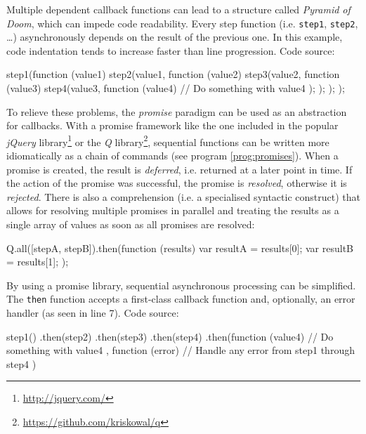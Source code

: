 \begin{program}
  \caption{Multiple dependent callback functions can lead to a structure called \textit{Pyramid of Doom}, which can impede code readability. Every step function (i.e. \texttt{step1}, \texttt{step2}, \ldots) asynchronously depends on the result of the previous one. In this example, code indentation tends to increase faster than line progression. Code source: \cite[p. 21]{Torstensson2012}}
  \label{prog:doom}
  \begin{JavaCode}
step1(function (value1) {
    step2(value1, function (value2) {
        step3(value2, function (value3) {
            step4(value3, function (value4) {
                // Do something with value4
            });
        });
    });
});	
  \end{JavaCode}
\end{program}
To relieve these problems, the \textit{promise} paradigm can be used as an abstraction for callbacks. With a promise framework like the one included in the popular \textit{jQuery} library\footnote{\url{http://jquery.com/}} or the \textit{Q} library\footnote{\url{https://github.com/kriskowal/q}}, sequential functions can be written more idiomatically as a chain of commands (see program \ref{prog:promises}). When a promise is created, the result is \textit{deferred}, i.e. returned at a later point in time. If the action of the promise was successful, the promise is \textit{resolved}, otherwise it is \textit{rejected}. There is also a comprehension (i.e. a specialised syntactic construct) that allows for resolving multiple promises in parallel and treating the results as a single array of values as soon as all promises are resolved:

\begin{JavaCode}
Q.all([stepA, stepB]).then(function (results) {
    var resultA = results[0];
    var resultB = results[1];
});
\end{JavaCode}

\begin{program}
  \caption{By using a promise library, sequential asynchronous processing can be simplified. The \texttt{then} function accepts a first-class callback function and, optionally, an error handler (as seen in line 7). Code source: \cite[p. 21]{Torstensson2012}}
  \label{prog:promises}
  \begin{JavaCode}
step1()
.then(step2)
.then(step3)
.then(step4)
.then(function (value4) {
    // Do something with value4
}, function (error) {
    // Handle any error from step1 through step4
})
  \end{JavaCode}
\end{program}


